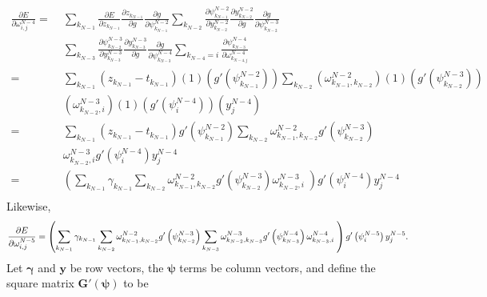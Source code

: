 \documentclass{article}
\begin{document}
\begin{equation} \label{eq:derive_du_nm4}
\begin{aligned}
\frac{\partial E}{\partial \omega_{i,j}^{N-4}} =& \;
%
\sum_{k_{N-1}}
\frac{\partial E}{\partial z_{k_{N-1}}}
\frac{\partial z_{k_{N-1}}}{\partial g}
\frac{\partial g}{\partial \psi_{k_{N-1}}^{N-2}}
%
\sum_{k_{N-2}}
\frac{\partial \psi_{k_{N-1}}^{N-2}}{\partial y_{k_{N-2}}^{N-2}}
\frac{\partial y_{k_{N-2}}^{N-2}}{\partial g}
\frac{\partial g}{\partial \psi_{k_{N-2}}^{N-3}} \\
%
& \;\sum_{k_{N-3}}
\frac{\partial \psi_{k_{N-2}}^{N-3}}{\partial y_{k_{N-3}}^{N-3}}
\frac{\partial y_{k_{N-3}}^{N-3}}{\partial g}
\frac{\partial g}{\partial \psi_{k_{N-3}}^{N-4}}
%
\sum_{k_{N-4}=i}
\frac{\partial \psi_{k_{N-3}}^{N-4}}{\partial \omega_{k_{N-4,j}}^{N-4}} \\
=& \; \sum_{k_{N-1}}
\left( z_{k_{N-1}} - t_{k_{N-1}} \right)
%
(1)
\left( g' \left( \psi_{k_{N-1}}^{N-2} \right) \right)
%
\sum_{k_{N-2}}
\left( \omega_{k_{N-1},k_{N-2}}^{N-2} \right)
(1)
\left( g' (\psi_{k_{N-2}}^{N-3}) \right) \\
%
& \; \left( \omega_{k_{N-2},i}^{N-3} \right)
(1)
\left( g' (\psi_i^{N-4}) \right)
%
\left( y_j^{N-4} \right) \\
=& \;
\sum_{k_{N-1}}
\left( z_{k_{N-1}} - t_{k_{N-1}} \right)
g' \left( \psi_{k_{N-1}}^{N-2} \right)
%
\sum_{k_{N-2}}
\omega_{k_{N-1},k_{N-2}}^{N-2}
g' \left( \psi_{k_{N-2}}^{N-3} \right) \\
%
& \; \omega_{k_{N-2},i}^{N-3}
g' \left( \psi_i^{N-4} \right)
y_j^{N-4} \\
=& \;
\left(
\sum_{k_{N-1}}
\gamma_{k_{N-1}}
%
\sum_{k_{N-2}}
\omega_{k_{N-1},k_{N-2}}^{N-2}
g' \left( \psi_{k_{N-2}}^{N-3} \right)
%
\omega_{k_{N-2},i}^{N-3} \;
\right)
g' \left( \psi_i^{N-4} \right)
y_j^{N-4} \\
\end{aligned}
\end{equation}
%
Likewise,
%
\begin{equation} \label{eq:derive_du_nm5}
\frac{\partial E}{\partial \omega_{i,j}^{N-5}} =
\left(
\sum_{k_{N-1}}
\gamma_{k_{N-1}}
%
\sum_{k_{N-2}}
\omega_{k_{N-1},k_{N-2}}^{N-2}
g' \left( \psi_{k_{N-2}}^{N-3} \right)
%
\sum_{k_{N-3}}
\omega_{k_{N-2},k_{N-3}}^{N-3}
g' \left( \psi_{k_{N-3}}^{N-4} \right)
%
\omega_{k_{N-3},i}^{N-4} \;
\right)
g' \left( \psi_i^{N-5} \right)
y_j^{N-5}
. \\
%
\end{equation}
%
Let $\bm{\gamma}$ and $\bm{y}$ be row vectors, the $\bm{\psi}$ terms be column vectors, and define the square matrix $\bm{G}' (\bm{\psi})$ to be
\end{document}
